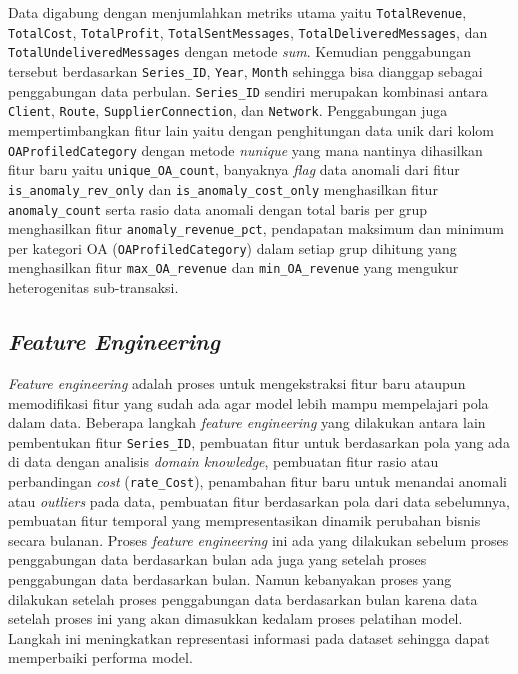     Data digabung dengan menjumlahkan metriks utama yaitu \texttt{TotalRevenue}, \texttt{TotalCost}, \texttt{TotalProfit}, \texttt{TotalSentMessages}, \texttt{TotalDeliveredMessages}, dan \texttt{TotalUndeliveredMessages} dengan metode \textit{sum}. Kemudian penggabungan tersebut berdasarkan \texttt{Series\_ID}, \texttt{Year}, \texttt{Month} sehingga bisa dianggap sebagai penggabungan data perbulan. \texttt{Series\_ID} sendiri  merupakan kombinasi antara \texttt{Client}, \texttt{Route}, \texttt{SupplierConnection}, dan \texttt{Network}. Penggabungan juga mempertimbangkan fitur lain yaitu dengan penghitungan data unik dari kolom \texttt{OAProfiledCategory} dengan metode \textit{nunique} yang mana nantinya dihasilkan fitur baru yaitu \texttt{unique\_OA\_count}, banyaknya \textit{flag} data anomali dari fitur \texttt{is\_anomaly\_rev\_only} dan \texttt{is\_anomaly\_cost\_only} menghasilkan fitur \texttt{anomaly\_count} serta rasio data anomali dengan total baris per grup menghasilkan fitur \texttt{anomaly\_revenue\_pct}, pendapatan maksimum dan minimum per kategori OA (\texttt{OAProfiledCategory}) dalam setiap grup dihitung yang menghasilkan fitur \texttt{max\_OA\_revenue} dan \texttt{min\_OA\_revenue} yang mengukur heterogenitas sub-transaksi.

    \subsection{\textit{Feature Engineering}}\label{}  
    \textit{Feature engineering} adalah proses untuk mengekstraksi fitur baru ataupun memodifikasi fitur yang sudah ada agar model lebih mampu mempelajari pola dalam data. Beberapa langkah \textit{feature engineering} yang dilakukan antara lain pembentukan fitur \texttt{Series\_ID}, pembuatan fitur untuk berdasarkan pola yang ada di data dengan analisis \textit{domain knowledge}, pembuatan fitur rasio atau perbandingan \textit{cost} (\texttt{rate\_Cost}), penambahan fitur baru untuk menandai anomali atau \textit{outliers} pada data, pembuatan fitur berdasarkan pola dari data sebelumnya, pembuatan fitur temporal yang mempresentasikan dinamik perubahan bisnis secara bulanan. Proses \textit{feature engineering} ini ada yang dilakukan sebelum proses penggabungan data berdasarkan bulan ada juga yang setelah proses penggabungan data berdasarkan bulan. Namun kebanyakan proses yang dilakukan setelah proses penggabungan data berdasarkan bulan karena data setelah proses ini yang akan dimasukkan kedalam proses pelatihan model. Langkah ini meningkatkan representasi informasi pada dataset sehingga dapat memperbaiki performa model.

